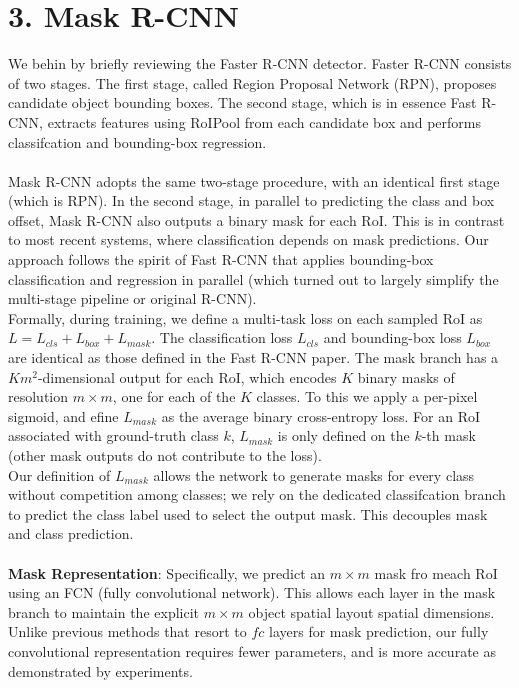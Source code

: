 \documentclass[a4paper]{report}
\begin{document}
\section*{3. Mask R-CNN}
We behin by briefly reviewing the Faster R-CNN detector. Faster R-CNN consists of two stages. The first stage, called Region Proposal Network (RPN), proposes candidate object bounding boxes. The second stage, which is in essence Fast R-CNN, extracts features using RoIPool from each candidate box and performs classifcation and bounding-box regression. 
\\
\\
Mask R-CNN adopts the same two-stage procedure, with an identical first stage (which is RPN). In the second stage, in parallel to predicting the class and box offset, Mask R-CNN also outputs a binary mask for each RoI. This is in contrast to most recent systems, where classification depends on mask predictions. Our approach follows the spirit of Fast R-CNN that applies bounding-box classification and regression in parallel (which turned out to largely simplify the multi-stage pipeline or original R-CNN).
\\
Formally, during training, we define a multi-task loss on each sampled RoI as $L = L_{cls} + L_{box} + L_{mask}$. The classification loss $L_{cls}$ and bounding-box loss $L_{box}$ are identical as those defined in the Fast R-CNN paper. The mask branch has a $Km^2$-dimensional output for each RoI, which encodes $K$ binary masks of resolution $m \times m$, one for each of the $K$ classes. To this we apply a per-pixel sigmoid, and efine $L_{mask}$ as the average binary cross-entropy loss. For an RoI associated with ground-truth class $k$, $L_{mask}$ is only defined on the $k$-th mask (other mask outputs do not contribute to the loss).
\\
Our definition of $L_{mask}$ allows the network to generate masks for every class without competition among classes; we rely on the dedicated classifcation branch to predict the class label used to select the output mask. This decouples mask and class prediction.
\\
\\
\textbf{Mask Representation}: Specifically, we predict an $m \times m$ mask fro meach RoI using an FCN (fully convolutional network). This allows each layer in the mask branch to maintain the explicit $m \times m$ object spatial layout spatial dimensions. Unlike previous methods that resort to $fc$ layers for mask prediction, our fully convolutional representation requires fewer parameters, and is more accurate as demonstrated by experiments.
\end{document}
